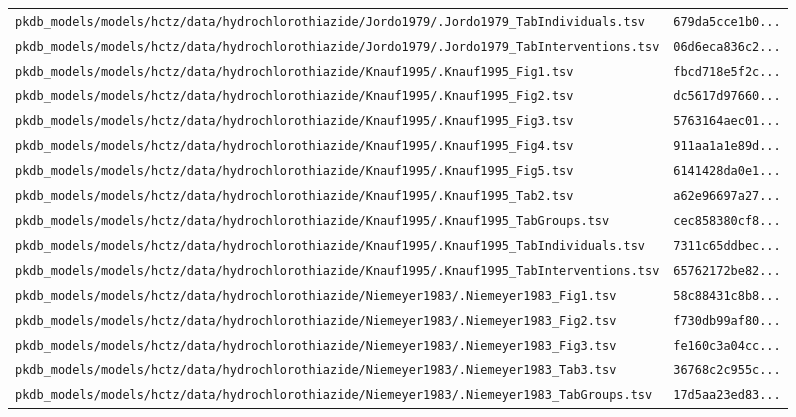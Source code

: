 \begin{longtable}{ll}
\texttt{pkdb\_models/models/hctz/data/hydrochlorothiazide/Jordo1979/.Jordo1979\_TabIndividuals.tsv} & \texttt{679da5cce1b0...} \\
\texttt{pkdb\_models/models/hctz/data/hydrochlorothiazide/Jordo1979/.Jordo1979\_TabInterventions.tsv} & \texttt{06d6eca836c2...} \\
\texttt{pkdb\_models/models/hctz/data/hydrochlorothiazide/Knauf1995/.Knauf1995\_Fig1.tsv} & \texttt{fbcd718e5f2c...} \\
\texttt{pkdb\_models/models/hctz/data/hydrochlorothiazide/Knauf1995/.Knauf1995\_Fig2.tsv} & \texttt{dc5617d97660...} \\
\texttt{pkdb\_models/models/hctz/data/hydrochlorothiazide/Knauf1995/.Knauf1995\_Fig3.tsv} & \texttt{5763164aec01...} \\
\texttt{pkdb\_models/models/hctz/data/hydrochlorothiazide/Knauf1995/.Knauf1995\_Fig4.tsv} & \texttt{911aa1a1e89d...} \\
\texttt{pkdb\_models/models/hctz/data/hydrochlorothiazide/Knauf1995/.Knauf1995\_Fig5.tsv} & \texttt{6141428da0e1...} \\
\texttt{pkdb\_models/models/hctz/data/hydrochlorothiazide/Knauf1995/.Knauf1995\_Tab2.tsv} & \texttt{a62e96697a27...} \\
\texttt{pkdb\_models/models/hctz/data/hydrochlorothiazide/Knauf1995/.Knauf1995\_TabGroups.tsv} & \texttt{cec858380cf8...} \\
\texttt{pkdb\_models/models/hctz/data/hydrochlorothiazide/Knauf1995/.Knauf1995\_TabIndividuals.tsv} & \texttt{7311c65ddbec...} \\
\texttt{pkdb\_models/models/hctz/data/hydrochlorothiazide/Knauf1995/.Knauf1995\_TabInterventions.tsv} & \texttt{65762172be82...} \\
\texttt{pkdb\_models/models/hctz/data/hydrochlorothiazide/Niemeyer1983/.Niemeyer1983\_Fig1.tsv} & \texttt{58c88431c8b8...} \\
\texttt{pkdb\_models/models/hctz/data/hydrochlorothiazide/Niemeyer1983/.Niemeyer1983\_Fig2.tsv} & \texttt{f730db99af80...} \\
\texttt{pkdb\_models/models/hctz/data/hydrochlorothiazide/Niemeyer1983/.Niemeyer1983\_Fig3.tsv} & \texttt{fe160c3a04cc...} \\
\texttt{pkdb\_models/models/hctz/data/hydrochlorothiazide/Niemeyer1983/.Niemeyer1983\_Tab3.tsv} & \texttt{36768c2c955c...} \\
\texttt{pkdb\_models/models/hctz/data/hydrochlorothiazide/Niemeyer1983/.Niemeyer1983\_TabGroups.tsv} & \texttt{17d5aa23ed83...} \\

\end{longtable}
